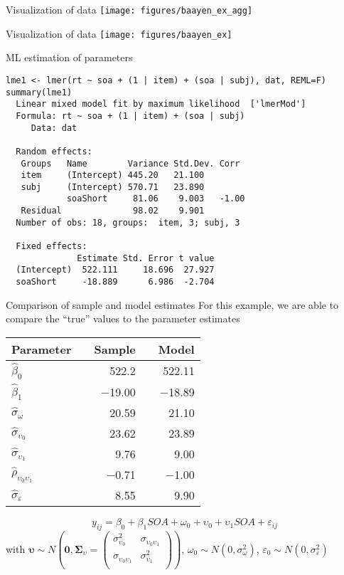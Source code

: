 \documentclass{beamer}
\newcommand{\gvect}[1]{\boldsymbol{#1}}
\newcommand{\gmat}[1]{\boldsymbol{#1}}
\begin{document}
\begin{frame}{Visualization of data}
  \centering
\texttt{[image: figures/baayen\_ex\_agg]}
\end{frame}

\begin{frame}{Visualization of data}
\texttt{[image: figures/baayen\_ex]}
\end{frame}

\begin{frame}[fragile]{ML estimation of parameters}
\begin{lstlisting}
lme1 <- lmer(rt ~ soa + (1 | item) + (soa | subj), dat, REML=F)
summary(lme1)
  Linear mixed model fit by maximum likelihood  ['lmerMod']
  Formula: rt ~ soa + (1 | item) + (soa | subj)
     Data: dat
  
  Random effects:
   Groups   Name        Variance Std.Dev. Corr 
   item     (Intercept) 445.20   21.100        
   subj     (Intercept) 570.71   23.890        
            soaShort     81.06    9.003   -1.00
   Residual              98.02    9.901        
  Number of obs: 18, groups:  item, 3; subj, 3
  
  Fixed effects:
              Estimate Std. Error t value
  (Intercept)  522.111     18.696  27.927
  soaShort     -18.889      6.986  -2.704
\end{lstlisting}
\end{frame}

\begin{frame}{Comparison of sample and model estimates}
  For this example, we are able to compare the ``true'' values to the
  parameter estimates
  \begin{center}
  \begin{tabular}{lrrrr}
    \hline
    Parameter && Sample && Model \\
    \hline
    $\hat\beta_0$ && 522.2 && 522.11\\
    $\hat\beta_1$ && $-$19.00 && $-$18.89\\
    $\hat\sigma_{\omega}$ && 20.59 && 21.10\\
    $\hat\sigma_{\upsilon_0}$ && 23.62 && 23.89\\
    $\hat\sigma_{\upsilon_1}$ && 9.76 && 9.00\\
    $\hat\rho_{\upsilon_0\upsilon_1}$ && $-$0.71 && $-$1.00\\
    $\hat\sigma_{\varepsilon}$ && 8.55 && 9.90\\
    \hline
  \end{tabular}
  \end{center}
     \[
    y_{ij} = \beta_0 + \beta_1 SOA + \omega_0 + \upsilon_0 + \upsilon_1 SOA
    + \varepsilon_{ij} 
  \]
\small
with $\gvect{\upsilon} \sim N\left(\gvect{0}, \gmat{\Sigma}_{\upsilon} = 
    \begin{pmatrix}
      \sigma^2_{\upsilon_0} & \sigma_{\upsilon_0\upsilon_1} \\
      \sigma_{\upsilon_0\upsilon_1} & \sigma^2_{\upsilon_1} \\
    \end{pmatrix}\right)$,
  $\omega_0 \sim N(0, \sigma_{\omega}^2)$, $\varepsilon_0 \sim N(0,
  \sigma_{\varepsilon}^2)$ 
\end{frame}
\end{document}
